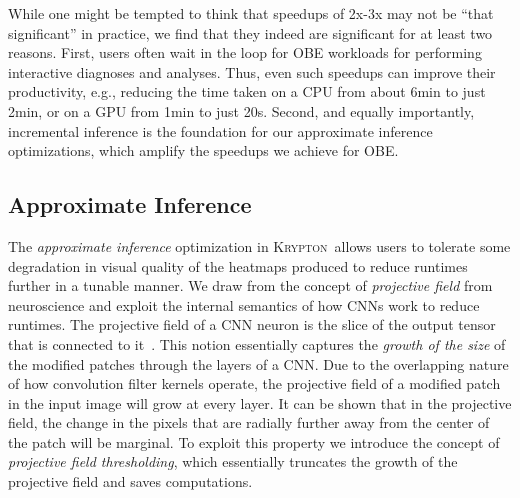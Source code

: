 \documentclass{vldb}
\newcommand{\system}{\textsc{Krypton}}
\begin{document}
While one might be tempted to think that speedups of 2x-3x may not be ``that significant'' in practice, we find that they indeed are significant for at least two reasons.
First, users often wait in the loop for OBE workloads for performing interactive diagnoses and analyses.
Thus, even such speedups can improve their productivity, e.g., reducing the time taken on a CPU from about 6min to just 2min, or on a GPU from
1min to just 20s.
Second, and equally importantly, incremental inference is the foundation for our approximate inference optimizations, which amplify the speedups we achieve for OBE.

\subsection{Approximate Inference}
The \textit{approximate inference} optimization in \system~allows users to tolerate some degradation in visual quality of the heatmaps produced to reduce runtimes further in a tunable manner.
We draw from the concept of \textit{projective field} from neuroscience and exploit the internal semantics of how CNNs work to reduce runtimes.
The projective field of a CNN neuron is the slice of the output tensor that is connected to it~\cite{basiccnnoperations}.
This notion essentially captures the \textit{growth of the size} of the modified patches through the layers of a CNN.
Due to the overlapping nature of how convolution filter kernels operate, the projective field of a modified patch in the input image will grow at every layer.
It can be shown that in the projective field, the change in the pixels that are radially further away from the center of the patch will be marginal.
To exploit this property we introduce the concept of \textit{projective field thresholding}, which essentially truncates the growth of the projective field and saves computations.


\end{document}
